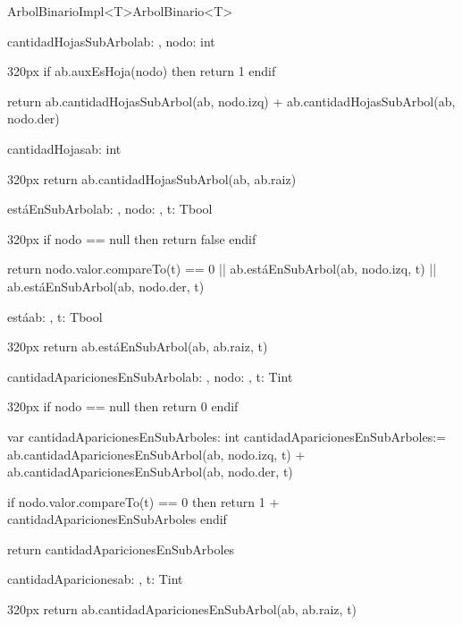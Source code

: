 \documentclass[10pt,a4paper]{article}
\begin{document}
\begin{ModuloImplements}{ArbolBinarioImpl<T>}{ArbolBinario<T>}
\begin{proc}{cantidadHojasSubArbol}{\In ab: , \In nodo: }{int}
\begin{ImplementationCode}{320px}
      if ab.auxEsHoja(nodo) then
        return 1
      endif

      return
        ab.cantidadHojasSubArbol(ab, nodo.izq) +
        ab.cantidadHojasSubArbol(ab, nodo.der)
    \end{ImplementationCode}
  \end{proc}
  \begin{proc}{cantidadHojas}{\In ab: }{int}
    \begin{ImplementationCode}{320px}
      return ab.cantidadHojasSubArbol(ab, ab.raiz)
    \end{ImplementationCode}
  \end{proc}
  \vspace{2em}
  \newpage
  \begin{proc}{estáEnSubArbol}{\In ab: , \In nodo: , \In t: T}{bool}
    \begin{ImplementationCode}{320px}
      if nodo == null then
        return false
      endif

      return nodo.valor.compareTo(t) == 0
        || ab.estáEnSubArbol(ab, nodo.izq, t)
        || ab.estáEnSubArbol(ab, nodo.der, t)
    \end{ImplementationCode}
  \end{proc}
  \begin{proc}{está}{\In ab: , \In t: T}{bool}
    \begin{ImplementationCode}{320px}
      return ab.estáEnSubArbol(ab, ab.raiz, t)
    \end{ImplementationCode}
  \end{proc}
  \vspace{2em}
  \begin{proc}{cantidadAparicionesEnSubArbol}{\In ab: , \In nodo: , \In t: T}{int}
    \begin{ImplementationCode}{320px}
      if nodo == null then
        return 0
      endif

      var cantidadAparicionesEnSubArboles: int
          cantidadAparicionesEnSubArboles:=
            ab.cantidadAparicionesEnSubArbol(ab, nodo.izq, t) +
            ab.cantidadAparicionesEnSubArbol(ab, nodo.der, t)

      if nodo.valor.compareTo(t) == 0 then
        return 1 + cantidadAparicionesEnSubArboles
      endif

      return cantidadAparicionesEnSubArboles
    \end{ImplementationCode}
  \end{proc}
  \begin{proc}{cantidadApariciones}{\In ab: , \In t: T}{int}
    \begin{ImplementationCode}{320px}
      return ab.cantidadAparicionesEnSubArbol(ab, ab.raiz, t)
    \end{ImplementationCode}
  \end{proc}
\end{ModuloImplements}
\end{document}
